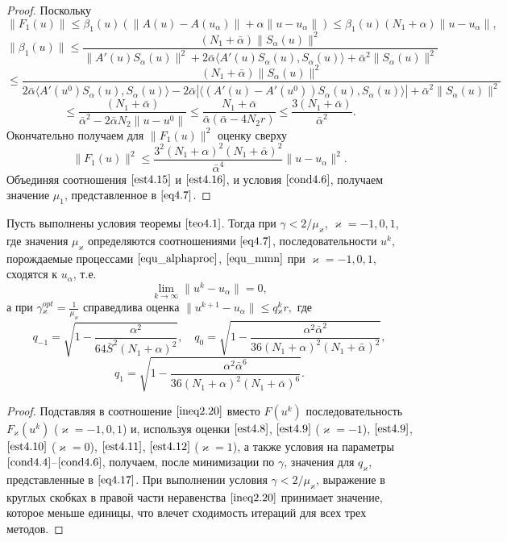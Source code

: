 \begin{proof}
Поскольку
$$\|F_1(u)\|\le\beta_1(u)(\|A(u)-A(u_\alpha)\|+\alpha\|u-u_\alpha\|)\le \beta_1(u)(N_1+\alpha)\|u-u_\alpha\|,$$ $$\|\beta_1(u)\|\le\frac{(N_1+\bar\alpha)\|S_\alpha(u)\|^2}{\|A'(u)S_\alpha(u)\|^2+2\bar\alpha\langle A'(u)S_\alpha(u), S_\alpha(u)\rangle+\bar\alpha^2\|S_\alpha(u)\|^2}$$ $$\le\frac{(N_1+\bar\alpha)\|S_\alpha(u)\|^2}{2\bar\alpha\langle A'(u^0)S_\alpha(u), S_\alpha(u)\rangle-2\bar\alpha|\langle (A'(u)-A'(u^0))S_\alpha(u), S_\alpha(u)\rangle|+\bar\alpha^2\|S_\alpha(u)\|^2}$$$$
\le\frac{(N_1+\bar\alpha)}{\bar\alpha^2-2\bar\alpha N_2\|u-u^0\|}\le\frac{N_1+\bar\alpha}{\bar\alpha(\bar\alpha - 4N_2 r)}\le\frac{3(N_1+\bar\alpha)}{\bar\alpha^2}.$$
Окончательно получаем для $\|F_1(u)\|^2$ оценку сверху
\begin{equation}\label{est4.16}
\|F_1(u)\|^2\le\frac{3^2(N_1+\alpha)^2(N_1+\bar\alpha)^2}{\bar\alpha^4}\|u-u_\alpha\|^2.
\end{equation}
Объединяя соотношения $\eqref{est4.15}$ и $\eqref{est4.16}$, и условия $\eqref{cond4.6}$, получаем значение $\mu_1$, представленное в $\eqref{eq4.7}$.
\end{proof}
\begin{theorem}\label{teo4.3}
	Пусть выполнены условия теоремы $\ref{teo4.1}$. Тогда при $\gamma<2/\mu _\varkappa$, $\varkappa=-1,0,1$, где значения $\mu _\varkappa$ определяются соотношениями $\eqref{eq4.7}$, последовательности ${u^k}$, порождаемые процессами $\eqref{equ_alphaproc}$, $\eqref{equ_mmn}$ при $\varkappa=-1,0,1$, сходятся к $u_\alpha$, т.е. $$\lim_{k\to\infty}\|u^k-u_\alpha\|=0,$$ а при $
	\gamma{_\varkappa^{opt}}=\frac{1}{\mu_\varkappa}$
	справедлива оценка $\|u^{k+1}-u_\alpha\|\le q{_\varkappa^k}r,$ где
	$$
	q_{-1}=\sqrt{1-\frac{\alpha^2}{64\bar S^2(N_1+\alpha)^2}}, \quad q_0=\sqrt{1-\frac{\alpha^2\bar\alpha^2}{36(N_1+\alpha)^2(N_1+\bar\alpha)^2}},$$
	\begin{equation}\label{eq4.17}
	q_1=\sqrt{1-\frac{\alpha^2\bar\alpha^6}{36(N_1+\alpha)^2(N_1+\bar\alpha)^6}}.
	\end{equation}
\end{theorem}
\begin{proof} Подставляя в соотношение $\eqref{ineq2.20}$ вместо $F(u^k)$ последовательность $F_\varkappa(u^k)$ ($\varkappa=-1,0,1$) и, используя оценки $\eqref{est4.8}$, $\eqref{est4.9}$ ($\varkappa=-1$), $\eqref{est4.9}$, $\eqref{est4.10}$ ($\varkappa=0$), $\eqref{est4.11}$, $\eqref{est4.12}$ ($\varkappa=1$), а также условия на параметры $\eqref{cond4.4}$--$\eqref{cond4.6}$, получаем, после минимизации по $\gamma$, значения для $q_\varkappa$, представленные в $\eqref{eq4.17}$. При выполнении условия $\gamma<2/\mu_\varkappa$, выражение в круглых скобках в правой части неравенства $\eqref{ineq2.20}$ принимает значение, которое меньше единицы, что влечет сходимость итераций для всех трех методов.
\end{proof}

